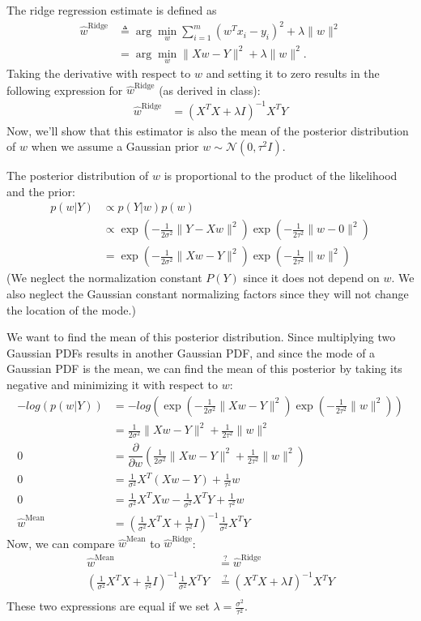 \documentclass{article}
\begin{document}
The ridge regression estimate is defined as
\begin{align*}
    \hat{w}^{\text{Ridge}} &\triangleq \arg\min_w \sum_{i=1}^{m} (w^T x_i - y_i)^2 + \lambda \|w\|^2\\
    &= \arg\min_w \|Xw - Y\|^2 + \lambda\|w\|^2.
\end{align*}
Taking the derivative with respect to $w$ and setting it to zero results in the following expression for $\hat{w}^{\text{Ridge}}$ (as derived in class):
\begin{align*}
    \hat{w}^{\text{Ridge}} &= (X^T X + \lambda I)^{-1} X^T Y
\end{align*}
Now, we'll show that this estimator is also the mean of the posterior distribution of $w$ when we assume a Gaussian prior $w \sim \mathcal{N}(0, \tau^2I)$.

The posterior distribution of $w$ is proportional to the product of the likelihood and the prior:
\begin{align*}
    p(w|Y) &\propto p(Y|w)p(w)\\
    &\propto \exp\left(-\frac{1}{2\sigma^2}\|Y - Xw\|^2\right)\exp\left(-\frac{1}{2\tau^2}\|w - 0\|^2\right)\\
    &= \exp\left(-\frac{1}{2\sigma^2}\|Xw - Y\|^2\right)\exp\left(-\frac{1}{2\tau^2}\|w\|^2\right)
\end{align*}
(We neglect the normalization constant $P(Y)$ since it does not depend on $w$.
We also neglect the Gaussian constant normalizing factors since they will not change the location of the mode.)

We want to find the mean of this posterior distribution.
Since multiplying two Gaussian PDFs results in another Gaussian PDF, and since the mode of a Gaussian PDF is the mean, we can find the mean of this posterior by taking its negative and minimizing it with respect to $w$:
\begin{align*}
    -log(p(w|Y)) &= -log\left(\exp\left(-\frac{1}{2\sigma^2}\|Xw - Y\|^2\right)\exp\left(-\frac{1}{2\tau^2}\|w\|^2\right)\right)\\
    &= \frac{1}{2\sigma^2}\|Xw - Y\|^2 + \frac{1}{2\tau^2}\|w\|^2\\
    0 &= \dfrac{\partial}{\partial w}\left(\frac{1}{2\sigma^2}\|Xw - Y\|^2 + \frac{1}{2\tau^2}\|w\|^2\right)\\
    0 &= \frac{1}{\sigma^2}X^T(Xw - Y) + \frac{1}{\tau^2}w\\
    0 &= \frac{1}{\sigma^2}X^TXw - \frac{1}{\sigma^2}X^TY + \frac{1}{\tau^2}w\\
    \hat{w}^{\text{Mean}} &= \left(\frac{1}{\sigma^2}X^TX + \frac{1}{\tau^2}I\right)^{-1}\frac{1}{\sigma^2}X^TY
\end{align*}
Now, we can compare $\hat{w}^{\text{Mean}}$ to $\hat{w}^{\text{Ridge}}$:
\begin{align*}
    \hat{w}^{\text{Mean}} &\stackrel{?}{=} \hat{w}^{\text{Ridge}}\\
    \left(\frac{1}{\sigma^2}X^TX + \frac{1}{\tau^2}I\right)^{-1}\frac{1}{\sigma^2}X^TY &\stackrel{?}{=} (X^T X + \lambda I)^{-1} X^T Y\\
\end{align*}
These two expressions are equal if we set $\lambda = \frac{\sigma^2}{\tau^2}$.
\end{document}
